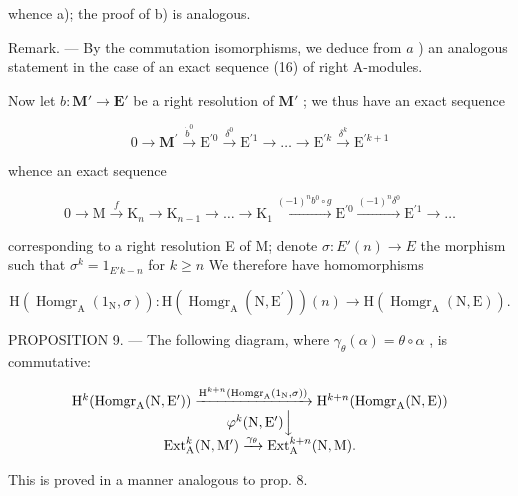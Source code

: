 whence a); the proof of b) is analogous.

Remark. --- By the commutation isomorphisms, we deduce from \(a\) ) an analogous statement in the case of an exact sequence (16) of right A-modules.

Now let \(b: \mathbf{M}' \to \mathbf{E}'\) be a right resolution of \(\mathbf{M}'\) ; we thus have an exact sequence

\[
0 \rightarrow \mathbf {M} ^ {\prime} \xrightarrow {\dot {b} ^ {0}} \mathrm{E} ^ {\prime 0} \xrightarrow {\delta^ {0}} \mathrm{E} ^ {\prime 1} \rightarrow \dots \rightarrow \mathrm{E} ^ {\prime k} \xrightarrow {\delta^ {k}} \mathrm{E} ^ {\prime k + 1}
\]

whence an exact sequence

\[
0 \rightarrow \mathrm{M} \xrightarrow {f} \mathrm{K} _ {n} \rightarrow \mathrm{K} _ {n - 1} \rightarrow \dots \rightarrow \mathrm{K} _ {1} \xrightarrow {(- 1) ^ {n} b ^ {0} \circ g} \mathrm{E} ^ {\prime 0} \xrightarrow {(- 1) ^ {n} \delta^ {0}} \mathrm{E} ^ {\prime 1} \rightarrow \dots
\]

corresponding to a right resolution E of M; denote \(\sigma : E'(n) \to E\) the morphism such that \(\sigma^k = 1_{E'k - n}\) for \(k \geqslant n\) We therefore have homomorphisms

\[
\mathrm{H} \left(\operatorname{Homgr} _ {\mathrm{A}} \left(1 _ {\mathrm{N}}, \sigma\right)\right): \mathrm{H} \left(\operatorname{Homgr} _ {\mathrm{A}} \left(\mathrm{N}, \mathrm{E} ^ {\prime}\right)\right) (n) \rightarrow \mathrm{H} \left(\operatorname{Homgr} _ {\mathrm{A}} (\mathrm{N}, \mathrm{E})\right).
\]

PROPOSITION 9. --- The following diagram, where \(\gamma_{\theta}(\alpha) = \theta \circ \alpha\) , is commutative:

\[
\begin{array}{c} \mathrm{H} ^ {k} (\text {Homgr} _ {\mathrm{A}} (\mathrm{N}, \mathrm{E} ^ {\prime})) \xrightarrow {\mathrm{H} ^ {k + n} (\text {Homgr} _ {\mathrm{A}} (1 _ {\mathrm{N}} , \sigma))} \mathrm{H} ^ {k + n} (\text {Homgr} _ {\mathrm{A}} (\mathrm{N}, \mathrm{E})) \\ \varphi^ {k} (\mathrm{N}, \mathrm{E} ^ {\prime}) \Big \downarrow \\ \operatorname{Ext} _ {\mathrm{A}} ^ {k} (\mathrm{N}, \mathrm{M} ^ {\prime}) \xrightarrow {\gamma_ {\theta}} \operatorname{Ext} _ {\mathrm{A}} ^ {k + n} (\mathrm{N}, \mathrm{M}). \end{array}
\]

This is proved in a manner analogous to prop. 8.

